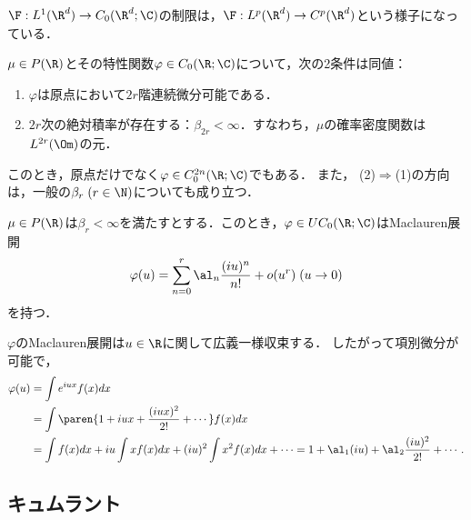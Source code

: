 \documentclass[uplatex,dvipdfmx]{jsreport}
\begin{document}
\begin{tcolorbox}[colframe=ForestGreen, colback=ForestGreen!10!white,breakable,colbacktitle=ForestGreen!40!white,coltitle=black,fonttitle=\bfseries\sffamily,
title=]
    $\F:L^1(\R^d)\to C_0(\R^d;\C)$の制限は，$\F:L^p(\R^d)\to C^p(\R^d)$という様子になっている．
\end{tcolorbox}

\begin{theorem}
    $\mu\in P(\R)$とその特性関数$\varphi\in C_0(\R;\C)$について，次の2条件は同値：
    \begin{enumerate}
        \item $\varphi$は原点において$2r$階連続微分可能である．
        \item $2r$次の絶対積率が存在する：$\beta_{2r}<\infty$．すなわち，$\mu$の確率密度関数は$L^{2r}(\Om)$の元．
    \end{enumerate}
    このとき，原点だけでなく$\varphi\in C^{2n}_0(\R;\C)$でもある．
    また，
    (2)$\Rightarrow$(1)の方向は，一般の$\beta_r\;(r\in\N)$についても成り立つ．
\end{theorem}

\begin{theorem}[特性関数のTaylor展開]
    $\mu\in P(\R)$は$\beta_r<\infty$を満たすとする．このとき，$\varphi\in UC_0(\R;\C)$はMaclauren展開
    \[\varphi(u)=\sum^r_{n=0}\al_n\frac{(iu)^n}{n!}+o(u^r)\;(u\to0)\]
    を持つ．
\end{theorem}
\begin{Proof}
    $\varphi$のMaclauren展開は$u\in\R$に関して広義一様収束する．
    したがって項別微分が可能で，
    \begin{align*}
        \varphi(u)&=\int e^{iux}f(x)dx\\
        &=\int\paren{1+iux+\frac{(iux)^2}{2!}+\cdots}f(x)dx\\
        &=\int f(x)dx+iu\int xf(x)dx+(iu)^2\int x^2f(x)dx+\cdots=1+\al_1(iu)+\al_2\frac{(iu)^2}{2!}+\cdots.
    \end{align*}
\end{Proof}

\subsection{キュムラント}
\end{document}
